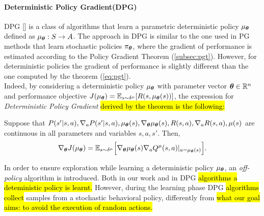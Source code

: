 \paragraph{Deterministic Policy Gradient(DPG)} \label{subsec:dpg}
\ac{DPG} [\cite{article}] is a class of algorithms that learn a parametric deterministic policy $\mu_{\boldsymbol{\theta}}$ defined as $\mu_{\boldsymbol{\theta}}: S \to A$. The approach in \ac{DPG} is similar to the one used in \ac{PG} methods that learn stochastic policies $\pi_{\boldsymbol{\theta}}$, where the gradient of performance is estimated according to the Policy Gradient Theorem (\ref{subsec:pgt}). However, for deterministic policies the gradient of performance is slightly different than the one computed by the theorem (\ref{eq:pgt}).\\
\newline
Indeed, by considering a deterministic policy $\mu_{\boldsymbol{\theta}}$ with parameter vector $\boldsymbol{\theta} \in \mathbb{R}^n$ and performance objective $J(\mu_{\boldsymbol{\theta}}) = \mathbb{E}_{s \sim \delta^{\mu}}[R(s, \mu_{\boldsymbol{\theta}}(s))]$, the expression for \emph{Deterministic Policy Gradient} \hl{derived by the theorem is the following:}
\begin{theorem} \label{th:dpgt}
	Suppose that $P(s'|s,a), \nabla_aP(s'|s,a), \mu_{\boldsymbol{\theta}}(s), \nabla_{\boldsymbol{\theta}} \mu_{\boldsymbol{\theta}}(s), R(s,a), \nabla_a R(s,a), \mu(s)$  are continuous in all parameters and variables $s, a, s'$. Then, 
	\begin{align}
	\nabla_{\boldsymbol{\theta}}J(\mu_{\boldsymbol{\theta}}) = \mathbb{E}_{s \sim \delta^{\mu}} \Big[\nabla_{\boldsymbol{\theta}} \mu_{\boldsymbol{\theta}} (s) \nabla_a Q^{\mu}(s,a)|_{a = \mu_{\boldsymbol{\theta}} (s)}\Big].
	\end{align}
\end{theorem}
\noindent In order to ensure exploration while learning a deterministic policy $\mu_{\boldsymbol{\theta}}$, an \emph{off-policy} algorithm is introduced. %
Both in our work and in \ac{DPG} \hl{algorithms a deteministic policy is learnt.} However, during the learning phase \ac{DPG} \hl{algorithms collect} samples from a stochastic behavioral policy, differently from \hl{what our goal aims: to avoid the execution of random actions.}\\
